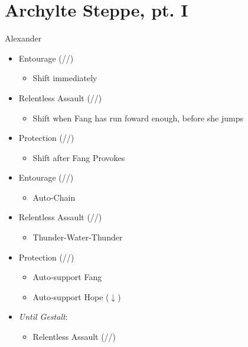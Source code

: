 \chapter{Archylte Steppe, pt. I}

\renewcommand{\first}{[1] Entourage (\rav/\med/\sen)}
\renewcommand{\second}{[2] Protection (\syn/\med/\sen)}
\renewcommand{\third}{[3] }
\renewcommand{\fourth}{[4] }
\renewcommand{\fifth}{[5] }
\renewcommand{\sixth}{[6] Relentless Assault (\rav/\rav/\com)}

\begin{battle}[1:29]{Alexander}
	\begin{itemize}
		\item \first
		      \begin{itemize}
			      \item Shift immediately
		      \end{itemize}
		\item \sixth
		      \begin{itemize}
			      \item Shift when Fang  has run foward enough, before she jumps
		      \end{itemize}
		\item \second
		      \begin{itemize}
			      \item Shift after Fang Provokes
		      \end{itemize}
		\item \first
		      \begin{itemize}
			      \item Auto-Chain
		      \end{itemize}
		\item \sixth
		      \begin{itemize}
			      \item Thunder-Water-Thunder
		      \end{itemize}
		\item \second
		      \begin{itemize}
			      \item Auto-support Fang
			      \item Auto-support Hope ($\downarrow$)
		      \end{itemize}
		\item \textit{Until Gestalt}:
		      \begin{itemize}
			      \item \begin{flushleft}\sixth\end{flushleft}

\end{itemize}
\end{itemize}
\end{battle}
